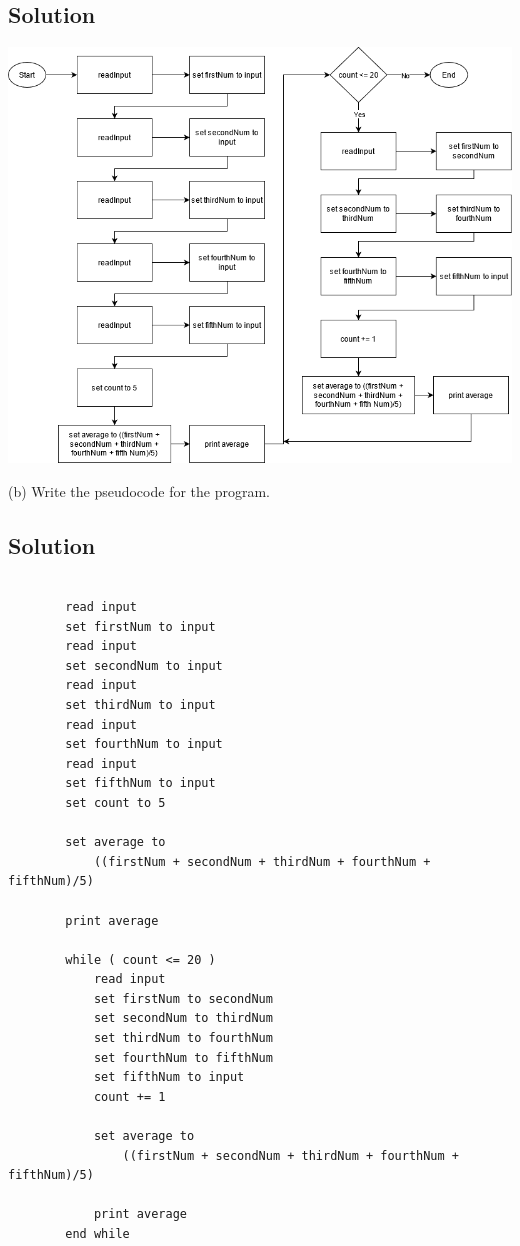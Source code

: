 \documentclass{article}
\begin{document}
    \subsection*{Solution}

    \begin{center}
        \includegraphics[scale=0.5]{Problem2_a.png}
    \end{center}

    (b) Write the pseudocode for the program.

    \subsection*{Solution}

    \begin{verbatim}

        read input 
        set firstNum to input
        read input
        set secondNum to input 
        read input 
        set thirdNum to input 
        read input 
        set fourthNum to input 
        read input 
        set fifthNum to input
        set count to 5

        set average to 
            ((firstNum + secondNum + thirdNum + fourthNum + fifthNum)/5)

        print average

        while ( count <= 20 )
            read input
            set firstNum to secondNum 
            set secondNum to thirdNum 
            set thirdNum to fourthNum 
            set fourthNum to fifthNum 
            set fifthNum to input
            count += 1

            set average to 
                ((firstNum + secondNum + thirdNum + fourthNum + fifthNum)/5)

            print average
        end while
    \end{verbatim}
\end{document}
